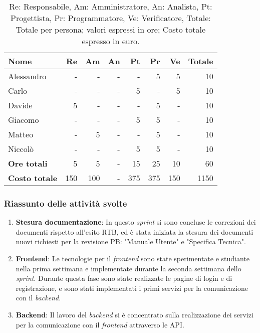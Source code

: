 \begin{table}[H]
	\centering
	\begin{tabular}{l|r|r|r|r|r|r|r}
		\textbf{Nome}         & \textbf{Re} & \textbf{Am} & \textbf{An} & \textbf{Pt} & \textbf{Pr} & \textbf{Ve} & \textbf{Totale} \\
		\hline
		Alessandro            & -           & -           & -           & -           & 5           & 5           & 10              \\
		Carlo                 & -           & -           & -           & 5           & -           & 5           & 10              \\
		Davide                & 5           & -           & -           & -           & 5           & -           & 10              \\
		Giacomo               & -           & -           & -           & 5           & 5           & -           & 10              \\
		Matteo                & -           & 5           & -           & -           & 5           & -           & 10              \\
		Niccolò               & -           & -           & -           & 5           & 5           & -           & 10              \\
		\hline
		\textbf{Ore totali}   & 5           & 5           & -           & 15          & 25          & 10          & 60              \\
		\textbf{Costo totale} & 150         & 100         & -           & 375         & 375         & 150         & 1150
	\end{tabular}
	\caption{Re: Responsabile, Am: Amministratore, An: Analista, Pt: Progettista,
		Pr: Programmatore, Ve: Verificatore, Totale: Totale per persona; valori espressi in ore; Costo totale espresso in euro.}
\end{table}

\subsubsection{Riassunto delle attività svolte}

\begin{enumerate}
	\item \textbf{Stesura documentazione}: In questo \textit{sprint} si sono concluse le correzioni dei documenti rispetto all'esito RTB,
	ed è stata iniziata la stesura dei documenti nuovi richiesti per la revisione PB: "Manuale Utente" e "Specifica Tecnica".

	\item \textbf{Frontend}: Le tecnologie per il \textit{frontend} sono state sperimentate e studiante nella prima settimana e implementate durante la seconda settimana
	dello \textit{sprint}. Durante questa fase sono state realizzate le pagine di login e di registrazione, e sono stati implementati i primi servizi per la comunicazione con il \textit{backend}. 

	\item \textbf{Backend}: Il lavoro del \textit{backend} si è concentrato sulla realizzazione dei servizi per la comunicazione con il \textit{frontend} attraverso le API.
\end{enumerate}

